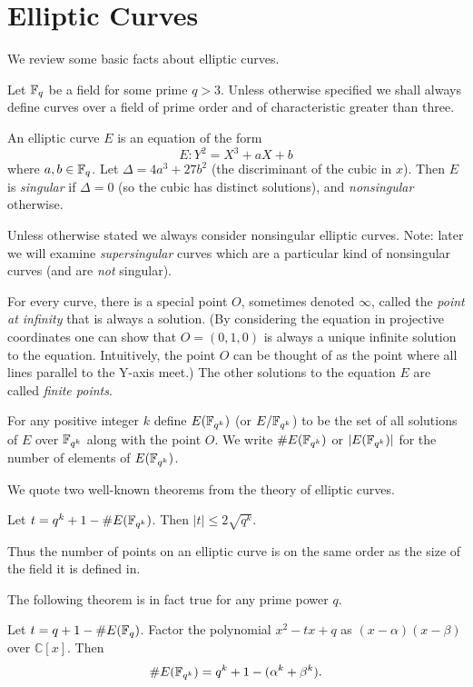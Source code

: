 \chapter {Elliptic Curves}
We review some basic facts about elliptic curves.

Let $\mathbb{F}_q$ be a field for some prime $q > 3$.
Unless otherwise specified we shall always
define curves over a field of prime order and of characteristic greater
than three.

An elliptic curve $E$ is an equation of the form
\[ E: Y^2 = X^3 + a X + b \]
where $a, b \in \mathbb{F}_q$.
Let $\Delta = 4 a^3 + 27b^2$ (the discriminant of the cubic in $x$). Then
$E$ is \emph{singular} if $\Delta = 0$ (so the cubic has distinct solutions),
and \emph{nonsingular} otherwise.

Unless otherwise stated we always consider nonsingular elliptic curves.
Note: later we will examine \emph{supersingular} curves which are a
particular kind of nonsingular curves (and are \emph{not} singular).

For every curve, there is a special point $O$, sometimes denoted $\infty$,
called the \emph{point at infinity}
that is always a solution. (By considering the equation in
projective coordinates one can show that $O = (0,1,0)$ is always a unique
infinite solution to the equation. Intuitively,
the point $O$ can be thought of as the point where all lines
parallel to the Y-axis meet.) The other solutions to the equation $E$
are called \emph{finite points}.

For any positive integer $k$ define $E(\mathbb{F}_{q^k})$ (or $E/\mathbb{F}_{q^k}$)
to be the set of all solutions
of $E$ over $\mathbb{F}_{q^k}$ along with the point $O$. We write $\#E(\mathbb{F}_{q^k})$ 
or $|E(\mathbb{F}_{q^k})|$ for
the number of elements of $E(\mathbb{F}_{q^k})$.

We quote two well-known theorems from the theory of elliptic curves.

\begin{theorem}
[Hasse] Let $t = q^k + 1 - \#E(\mathbb{F}_{q^k})$.
Then $|t| \le 2\sqrt{q^k}$.
\end{theorem}

Thus the number of points on an elliptic curve is on the same order as the
size of the field it is defined in.

The following theorem is in fact true for any prime power $q$.

\begin{theorem}
[Weil] Let $t = q + 1 - \#E(\mathbb{F}_q)$.
Factor the polynomial $x^2 - t x + q$ as $(x-\alpha)(x-\beta)$ over
$\mathbb{C}[x]$.
Then
\[ \#E(\mathbb{F}_{q^k}) = q^k + 1 - (\alpha^k + \beta^k) .\]
\end{theorem}

